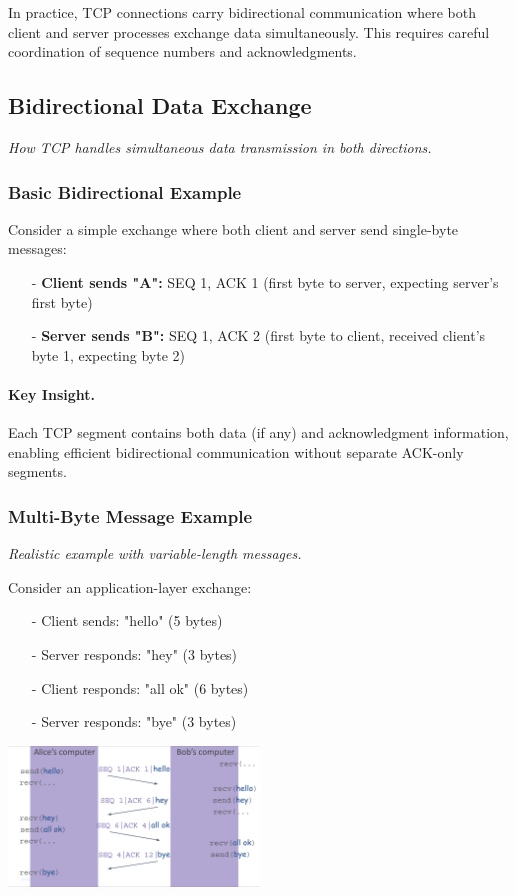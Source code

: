 \documentclass[../../compsys.tex]{subfiles}
\begin{document}
In practice, TCP connections carry bidirectional communication where both client and server processes exchange data simultaneously. This requires careful coordination of sequence numbers and acknowledgments.

\subsection{Bidirectional Data Exchange}
\textit{How TCP handles simultaneous data transmission in both directions.}

\subsubsection{Basic Bidirectional Example}
Consider a simple exchange where both client and server send single-byte messages:

\begin{itemize}
  \item[-] \textbf{Client sends "A":} SEQ 1, ACK 1 (first byte to server, expecting server's first byte)
  \item[-] \textbf{Server sends "B":} SEQ 1, ACK 2 (first byte to client, received client's byte 1, expecting byte 2)
\end{itemize}

\paragraph{Key Insight.} Each TCP segment contains both data (if any) and acknowledgment information, enabling efficient bidirectional communication without separate ACK-only segments.

\subsubsection{Multi-Byte Message Example}
\textit{Realistic example with variable-length messages.}

Consider an application-layer exchange:
\begin{itemize}
  \item[-] Client sends: "hello" (5 bytes)
  \item[-] Server responds: "hey" (3 bytes)  
  \item[-] Client responds: "all ok" (6 bytes)
  \item[-] Server responds: "bye" (3 bytes)
\end{itemize}

\begin{center}
  \includegraphics[width=0.5\textwidth]{images/alice-bob.png}
\end{center}
\end{document}
